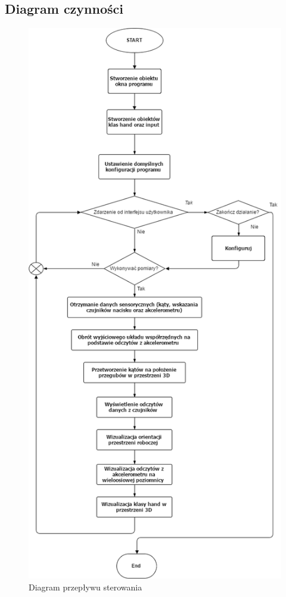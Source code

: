 \documentclass[12pt,a4paper]{article}
\begin{document}
\subsection{Diagram czynności}
\begin{figure}[!htb]
\centering
\includegraphics[height=0.8\textheight]{./Diagram_przeplywu_sterowania.png}
\caption{Diagram przepływu sterowania}
\end{figure}
\end{document}

